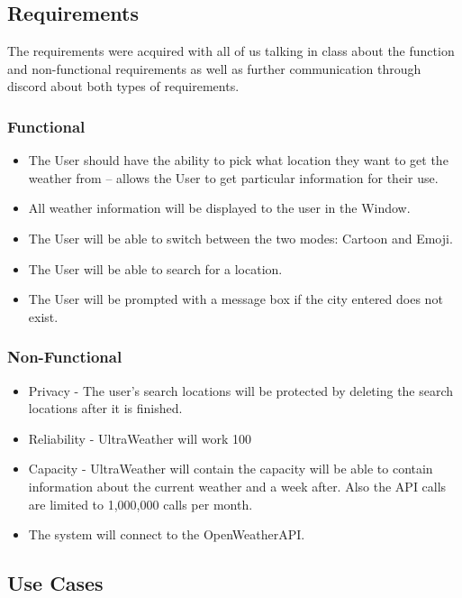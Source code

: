 \documentclass[10pt,conference,onecolumn,compsoc]{IEEEtran}
\begin{document}
\subsection{Requirements}
The requirements were acquired with all of us talking in class about the function and non-functional requirements as well as further communication through discord about both types of requirements.

\subsubsection{Functional}
\begin{itemize}
\item The User should have the ability to pick what location they want to get the weather from -- allows the User to get particular information for their use.
\item All weather information will be displayed to the user in the Window.
\item The User will be able to switch between the two modes: Cartoon and Emoji.
\item The User will be able to search for a location.
\item The User will be prompted with a message box if the city entered does not exist.
\end{itemize}

\subsubsection{Non-Functional}
\begin{itemize}
\item Privacy - The user's search locations will be protected by deleting the search locations after it is finished.
\item Reliability - UltraWeather will work 100%
\item Capacity - UltraWeather will contain the capacity will be able to contain information about the current weather and a week after. Also the API calls are limited to 1,000,000 calls per month.
\item The system will connect to the OpenWeatherAPI.
\end{itemize}

\subsection{Use Cases}
\end{document}

